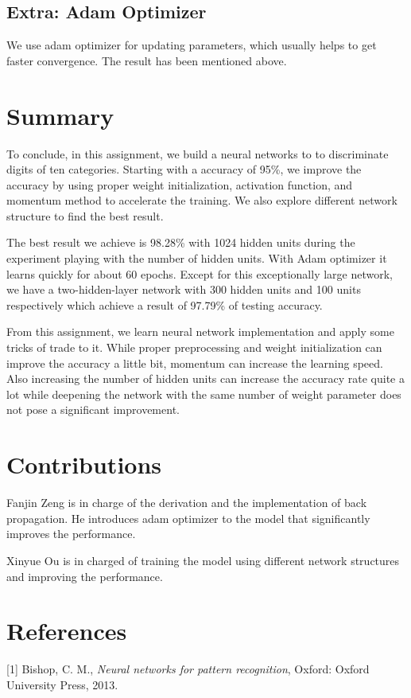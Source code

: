\documentclass{article}
\begin{document}
\subsection{Extra: Adam Optimizer}
We use adam optimizer for updating parameters, which usually helps to get faster convergence. The result has been mentioned above.  


\newpage
\section{Summary}
To conclude, in this assignment, we build a neural networks to to discriminate digits of ten categories. Starting with a accuracy of 95\%, we improve the accuracy by using proper weight initialization, activation function, and momentum method to accelerate the training. We also explore different network structure to find the best result. 

The best result we achieve is 98.28\% with 1024 hidden units during the experiment playing with the number of hidden units.  With Adam optimizer it learns quickly for about 60 epochs.
Except for this exceptionally large network, we have a two-hidden-layer network with 300 hidden units and 100 units respectively which achieve a result of 97.79\% of testing accuracy.

From this assignment, we learn neural network implementation and apply some tricks of trade to it. While proper preprocessing and weight initialization can improve the accuracy a little bit, momentum can increase the learning speed. Also increasing the number of hidden units can increase the accuracy rate quite a lot while deepening the network with the same number of weight parameter does not pose a significant improvement.
\section{Contributions}
Fanjin Zeng is in charge of the derivation and the implementation of back propagation. He introduces adam optimizer to the model that significantly improves the performance. 

Xinyue Ou is in charged of training the model using different network structures and improving the performance.


\section{References}
[1] Bishop, C. M., {\it Neural networks for pattern recognition}, Oxford: Oxford University Press, 2013.
\end{document}
